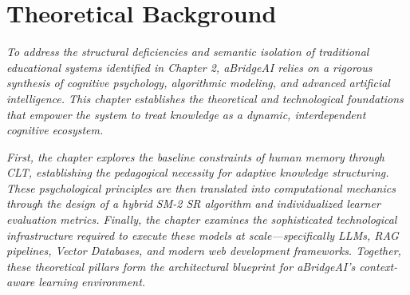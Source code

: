 \section{Theoretical Background}

\textit{To address the structural deficiencies and semantic isolation of traditional educational systems identified in Chapter 2, aBridgeAI relies on a rigorous synthesis of cognitive psychology, algorithmic modeling, and advanced artificial intelligence. This chapter establishes the theoretical and technological foundations that empower the system to treat knowledge as a dynamic, interdependent cognitive ecosystem.}

\textit{First, the chapter explores the baseline constraints of human memory through CLT, establishing the pedagogical necessity for adaptive knowledge structuring. These psychological principles are then translated into computational mechanics through the design of a hybrid SM-2 SR algorithm and individualized learner evaluation metrics. Finally, the chapter examines the sophisticated technological infrastructure required to execute these models at scale—specifically LLMs, RAG pipelines, Vector Databases, and modern web development frameworks. Together, these theoretical pillars form the architectural blueprint for aBridgeAI's context-aware learning environment.}